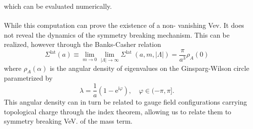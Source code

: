 \documentclass[a4paper,10pt]{book}
\begin{document}
which can be evaluated numerically.\\\\While this computation can prove the existence of a non- vanishing Vev. It does not reveal the dynamics of the symmetry breaking mechanism. This can be realized, however through the Banks-Casher relation \cite{BanksT1980Csbi}
\begin{equation}
\Sigma^{\mathrm{lat}}(a) \equiv \lim _{m \rightarrow 0} \lim _{|\Lambda| \rightarrow \infty} \Sigma^{\text {lat }}(a, m,|\Lambda|)=\frac{\pi}{a^{3}} \rho_{A}(0)
\end{equation}
where $\rho_{A}(\alpha)$ is the angular density of eigenvalues on the Ginsparg-Wilson circle parametrized by 
\begin{equation}
\lambda=\frac{1}{a}\left(1-\mathrm{e}^{\mathrm{i} \varphi}\right), \quad \varphi \in(-\pi, \pi].
\end{equation}
This angular density can in turn be related to gauge field configurations carrying topological charge through the index theorem, allowing us to relate them to symmetry breaking VeV. of the mass term.
\end{document}
